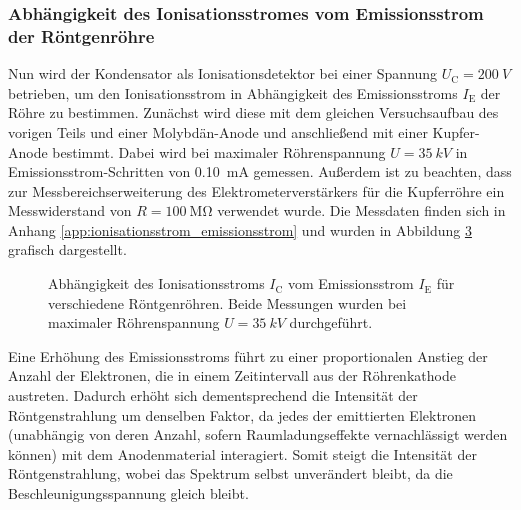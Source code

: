 \documentclass[11pt, a4paper]{article}
\numberwithin{equation}{section}
\begin{document}
\subsubsection{Abhängigkeit des Ionisationsstromes vom Emissionsstrom der Röntgenröhre}
Nun wird der Kondensator als Ionisationsdetektor bei einer Spannung $U_\mathrm{C} = \SI{200}{V}$ betrieben, um den Ionisationsstrom in Abhängigkeit des Emissionsstroms $I_\mathrm{E}$ der Röhre zu bestimmen.
Zunächst wird diese mit dem gleichen Versuchsaufbau des vorigen Teils und einer Molybdän-Anode und anschließend mit einer Kupfer-Anode bestimmt.
Dabei wird bei maximaler Röhrenspannung $U = \SI{35}{kV}$ in Emissionsstrom-Schritten von \SI{0.10}{mA} gemessen.
Außerdem ist zu beachten, dass zur Messbereichserweiterung des Elektrometerverstärkers für die Kupferröhre ein Messwiderstand von $R=\SI{100}{\mega\ohm}$ verwendet wurde.
Die Messdaten finden sich in Anhang \ref{app:ionisationsstrom_emissionsstrom} und wurden in Abbildung \ref{fig:abh_emissionsstrom} grafisch dargestellt.
\begin{figure}[hp]
	\centering
	\begin{subfigure}[b]{1\textwidth}
		
		\label{fig:mo_emissionsstrom}
	\end{subfigure}
	
	\vspace{10mm}
	
	\begin{subfigure}[b]{1\textwidth}
		
		\label{fig:cu_emissionsstrom}
	\end{subfigure}
	\caption{Abhängigkeit des Ionisationsstroms $I_\mathrm{C}$ vom Emissionsstrom $I_\mathrm{E}$ für verschiedene Röntgenröhren. Beide Messungen wurden bei maximaler Röhrenspannung $U=\SI{35}{kV}$ durchgeführt.}
	\label{fig:abh_emissionsstrom}
\end{figure}
Eine Erhöhung des Emissionsstroms führt zu einer proportionalen Anstieg der Anzahl der Elektronen, die in einem Zeitintervall aus der Röhrenkathode austreten.
Dadurch erhöht sich dementsprechend die Intensität der Röntgenstrahlung um denselben Faktor, da jedes der emittierten Elektronen (unabhängig von deren Anzahl, sofern Raumladungseffekte vernachlässigt werden können) mit dem Anodenmaterial interagiert.
Somit steigt die Intensität der Röntgenstrahlung, wobei das Spektrum selbst unverändert bleibt, da die Beschleunigungsspannung gleich bleibt.
\end{document}
